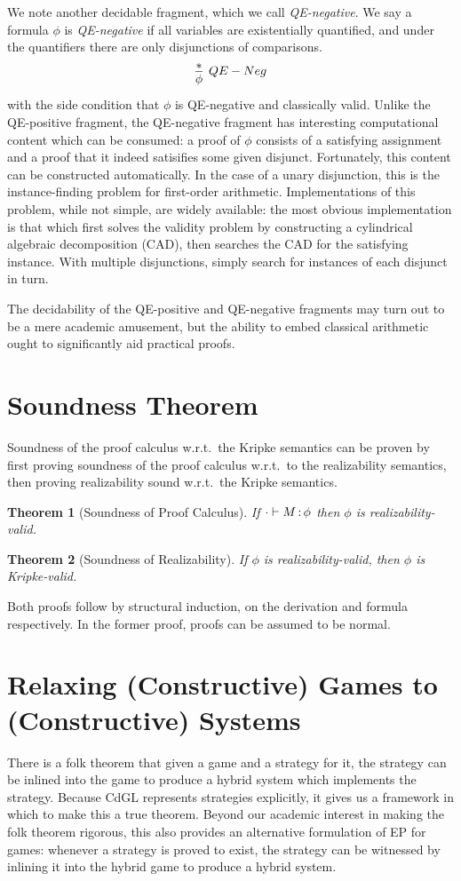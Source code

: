 \documentclass[12pt]{cmuthesis}
\newtheorem{theorem}{Theorem}
\theoremstyle{definition}
\theoremstyle{remark}
\newcommand{\CdGL}{\textsf{CdGL}\xspace}
\begin{document}
We note another decidable fragment, which we call \emph{QE-negative}.
We say a formula $\phi$ is \emph{QE-negative} if all variables are existentially quantified, and under the quantifiers there are  only disjunctions of comparisons.
\[\infer[QE-Neg]{\phi}{*}\] with the side condition that $\phi$ is  QE-negative and classically valid.
Unlike the QE-positive fragment, the QE-negative fragment has interesting computational content which can be consumed: a proof of $\phi$ consists of a satisfying assignment and a proof that it indeed satisifies some given disjunct.
Fortunately, this content can be constructed automatically.
In the case of a unary disjunction, this is the instance-finding problem for first-order arithmetic.
Implementations of this problem, while not simple, are widely available: the most obvious implementation is that which first solves the validity problem by constructing a cylindrical algebraic decomposition (CAD), then searches the CAD for the satisfying instance.
With multiple disjunctions, simply search for instances of each disjunct in turn.

The decidability of the QE-positive and QE-negative fragments may turn out to be a mere academic amusement, but the ability to embed classical arithmetic ought to significantly aid practical proofs.

\section{Soundness Theorem}
Soundness of the proof calculus w.r.t.\ the Kripke semantics can be proven by first proving soundness of the proof calculus w.r.t.\ to the realizability semantics,
then proving realizability sound w.r.t.\ the Kripke semantics.
\begin{theorem}[Soundness of Proof Calculus]
  If $\cdot \vdash M\mathop{:}\phi$ then $\phi$ is realizability-valid.
\end{theorem}
\begin{theorem}[Soundness of Realizability]
  If $\phi$ is realizability-valid, then $\phi$ is Kripke-valid.
\end{theorem}
Both proofs follow by structural induction, on the derivation and formula respectively.
In the former proof, proofs can be assumed to be normal.

\section{Relaxing (Constructive) Games to (Constructive) Systems}
There is a folk theorem that given a game and a strategy for it, the strategy can be inlined into the game to produce a hybrid system which implements the strategy.
Because \CdGL represents strategies explicitly, it gives us a framework in which to make this a true theorem.
Beyond our academic interest in making the folk theorem rigorous, this also provides an alternative formulation of EP for games: whenever a strategy is proved to exist, the strategy can be witnessed by inlining it into the hybrid game to produce a hybrid system.
\end{document}
